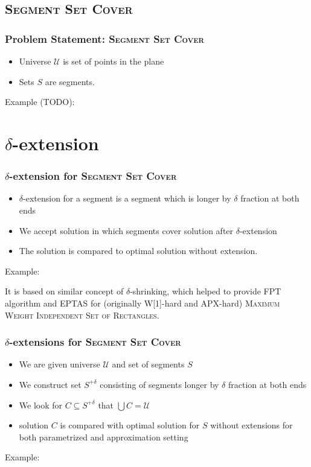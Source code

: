 \documentclass{beamer}
\begin{document}
\subsection{\textsc{Segment Set Cover}}

\begin{frame}
\frametitle{Problem Statement: \textsc{Segment Set Cover}}
\begin{itemize}
\item Universe $\mathcal{U}$ is set of points in the plane
\item Sets $S$ are segments.
\end{itemize}

Example (TODO):




\end{frame}

\section{$\delta$-extension}
\begin{frame}
\frametitle{$\delta$-extension for \textsc{Segment Set Cover}}
\begin{itemize}
\item $\delta$-extension for a segment is a segment which is longer by
$\delta$ fraction at both ends
\item We accept solution in which segments cover solution after
$\delta$-extension
\item The solution is compared to optimal solution without extension.
\end{itemize}

Example:



It is based on similar concept of $\delta$-shrinking,
which helped to provide FPT algorithm and EPTAS for 
(originally W[1]-hard and APX-hard)
\textsc{Maximum Weight Independent Set of Rectangles}.
\end{frame}

\begin{frame}
\frametitle{$\delta$-extensions for \textsc{Segment Set Cover}}
\begin{itemize}
\item We are given universe $\mathcal{U}$ and set of segments $S$
\item We construct set $S^{+\delta}$ consisting of  
segments longer by $\delta$ fraction at both ends
\item We look for $C \subseteq S^{+\delta}$ that $\bigcup C = \mathcal{U}$
\item solution $C$ is compared with optimal solution for $S$ without extensions
for both parametrized and approximation setting
\end{itemize}

Example:


\end{frame}
\end{document}
